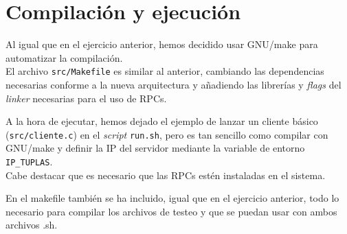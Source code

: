 \section{Compilación y ejecución}

Al igual que en el ejercicio anterior, hemos decidido usar GNU/make para automatizar la compilación.\\
El archivo \texttt{src/Makefile} es similar al anterior, cambiando las dependencias necesarias conforme a la nueva arquitectura y añadiendo las librerías y \textit{flags} del \textit{linker} necesarias para el uso de RPCs.\newline

A la hora de ejecutar, hemos dejado el ejemplo de lanzar un cliente básico (\texttt{src/cliente.c}) en el \textit{script} \texttt{run.sh}, pero es tan sencillo como compilar con GNU/make y definir la IP del servidor mediante la variable de entorno \texttt{IP\_TUPLAS}.\\
Cabe destacar que es necesario que las RPCs estén instaladas en el sistema.

En el makefile también se ha incluido, igual que en el ejercicio anterior, todo lo necesario para compilar los archivos de testeo y que se puedan usar con ambos archivos .sh.